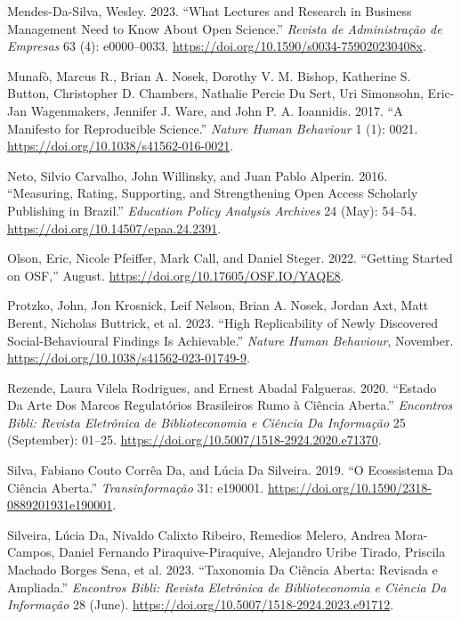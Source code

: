 \documentclass[
  a4paper,
]{article}
\newlength{\cslhangindent}
\newenvironment{CSLReferences}[2] %
 {\begin{list}{}{%
  \setlength{\itemindent}{0pt}
  \setlength{\leftmargin}{0pt}
  \setlength{\parsep}{0pt}
  \ifodd #1
   \setlength{\leftmargin}{\cslhangindent}
   \setlength{\itemindent}{-1\cslhangindent}
  \fi
  \setlength{\itemsep}{#2\baselineskip}}}
 {\end{list}}
\begin{document}
\begin{CSLReferences}{1}{0}
Mendes-Da-Silva, Wesley. 2023. {``What {Lectures} and {Research} in
{Business Management Need} to {Know About Open Science}.''}
\emph{Revista de Administra{ç}{ã}o de Empresas} 63 (4): e0000--0033.
\url{https://doi.org/10.1590/s0034-759020230408x}.

Munafò, Marcus R., Brian A. Nosek, Dorothy V. M. Bishop, Katherine S.
Button, Christopher D. Chambers, Nathalie Percie Du Sert, Uri Simonsohn,
Eric-Jan Wagenmakers, Jennifer J. Ware, and John P. A. Ioannidis. 2017.
{``A Manifesto for Reproducible Science.''} \emph{Nature Human
Behaviour} 1 (1): 0021. \url{https://doi.org/10.1038/s41562-016-0021}.

Neto, Silvio Carvalho, John Willinsky, and Juan Pablo Alperin. 2016.
{``Measuring, Rating, Supporting, and Strengthening Open Access
Scholarly Publishing in {Brazil}.''} \emph{Education Policy Analysis
Archives} 24 (May): 54--54. \url{https://doi.org/10.14507/epaa.24.2391}.

Olson, Eric, Nicole Pfeiffer, Mark Call, and Daniel Steger. 2022.
{``Getting Started on OSF,''} August.
\url{https://doi.org/10.17605/OSF.IO/YAQE8}.

Protzko, John, Jon Krosnick, Leif Nelson, Brian A. Nosek, Jordan Axt,
Matt Berent, Nicholas Buttrick, et al. 2023. {``High Replicability of
Newly Discovered Social-Behavioural Findings Is Achievable.''}
\emph{Nature Human Behaviour}, November.
\url{https://doi.org/10.1038/s41562-023-01749-9}.

Rezende, Laura Vilela Rodrigues, and Ernest Abadal Falgueras. 2020.
{``Estado Da Arte Dos Marcos Regulat{ó}rios Brasileiros Rumo {à}
{Ci{ê}ncia Aberta}.''} \emph{Encontros Bibli: Revista Eletr{ô}nica de
Biblioteconomia e Ci{ê}ncia Da Informa{ç}{ã}o} 25 (September): 01--25.
\url{https://doi.org/10.5007/1518-2924.2020.e71370}.

Silva, Fabiano Couto Corrêa Da, and Lúcia Da Silveira. 2019. {``O
Ecossistema Da {Ci{ê}ncia Aberta}.''} \emph{Transinforma{ç}{ã}o} 31:
e190001. \url{https://doi.org/10.1590/2318-0889201931e190001}.

Silveira, Lúcia Da, Nivaldo Calixto Ribeiro, Remedios Melero, Andrea
Mora-Campos, Daniel Fernando Piraquive-Piraquive, Alejandro Uribe
Tirado, Priscila Machado Borges Sena, et al. 2023. {``Taxonomia Da
{Ci{ê}ncia Aberta}: Revisada e Ampliada.''} \emph{Encontros Bibli:
Revista Eletr{ô}nica de Biblioteconomia e Ci{ê}ncia Da Informa{ç}{ã}o}
28 (June). \url{https://doi.org/10.5007/1518-2924.2023.e91712}.


\end{CSLReferences}
\end{document}
